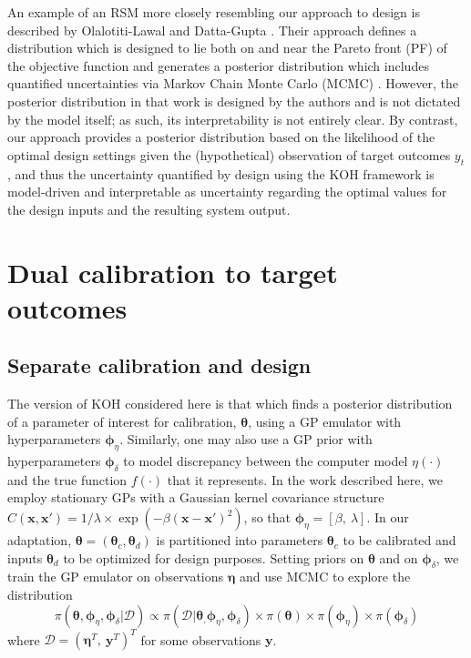 \documentclass[10pt]{asme2ej}
\begin{document}
%
An example of an RSM more closely resembling our approach to design is described by  Olalotiti-Lawal and Datta-Gupta \cite{Olalotiti2018}.
%
Their approach defines a distribution which is designed to lie both on and near the Pareto front (PF) of the objective function and generates a posterior distribution which includes quantified uncertainties via Markov Chain Monte Carlo (MCMC) \cite{Gelfand1990}.
%
However, the posterior distribution in that work is designed by the authors and is not dictated by the model itself; as such, its interpretability is not entirely clear.
%
By contrast, our approach provides a posterior distribution based on the likelihood of the optimal design settings given the (hypothetical) observation of target outcomes $y_t$, and thus the uncertainty quantified by design using the KOH framework is model-driven and interpretable as uncertainty regarding the optimal values for the design inputs and the resulting system output.
%



%
\section{Dual calibration to target outcomes}\label{sec:dcto}
\subsection{Separate calibration and design}
%
The version of KOH considered here is that which finds a posterior distribution of a parameter of interest for calibration, $\boldsymbol\theta$, using a GP emulator with hyperparameters ${\boldsymbol\phi_\eta}$.
%
Similarly, one may also use a GP prior with hyperparameters $\boldsymbol\phi_\delta$ to model discrepancy between the computer model $\eta(\cdot)$ and the true function $f(\cdot)$ that it represents.
%
In the work described here, we employ stationary GPs with a Gaussian kernel covariance structure $C(\mathbf x,\mathbf x') = 1/\lambda \times \exp(-\beta(\mathbf x-\mathbf x')^2)$, so that ${\boldsymbol\phi_\eta} = \left[\beta,\ \lambda\right]$.
%
In our adaptation, $\boldsymbol\theta=(\boldsymbol\theta_c,\boldsymbol\theta_d)$ is partitioned into parameters $\boldsymbol\theta_c$ to be calibrated and inputs $\boldsymbol\theta_d$ to be optimized for design purposes.
%
Setting priors on $\boldsymbol\theta$ and on $\boldsymbol \phi_\delta$, we train the GP emulator on observations $\boldsymbol \eta$ and use MCMC to explore the distribution
\begin{equation} \label{eq:full_dist}
	\pi(\boldsymbol \theta,{\boldsymbol\phi_\eta},\boldsymbol \phi_\delta|\mathcal D)
	\propto \pi(\mathcal D | \boldsymbol \theta_,{\boldsymbol\phi_\eta}, \boldsymbol\phi_\delta) %
	\times \pi(\boldsymbol\theta)
	\times \pi(\boldsymbol\phi_\eta)
	\times \pi(\boldsymbol\phi_\delta)
\end{equation}
%
where $\mathcal D = (\boldsymbol\eta^T,\ \mathbf y^T)^T$ for some observations $\mathbf y$.
%
\end{document}

